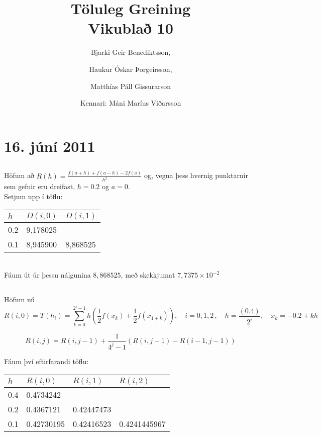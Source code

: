 \documentclass[10pt,a4paper]{article}
\begin{document}
\title{Töluleg Greining\\Vikublað 10}
\author{ 
  Bjarki Geir Benediktsson,\and
  Haukur Óskar Þorgeirsson,\and
  Matthías Páll Gissurarson \and
  Kennari: Máni Maríus Viðarsson
  }
\maketitle

\setcounter{section}{8}

\section{16. júní 2011}

\subsection{}

Höfum að $R(h) = \frac{f(a+h) + f(a-h) - 2f(a)}{h^2}$ og, vegna þess hvernig punktarnir sem gefnir eru dreifast, $h=0.2$ og $a=0$.\\

Setjum upp í töflu:

\begin{tabular}{l|ll}
$h$&$D(i,0)$&$D(i,1)$\\ \hline
0.2&9,178025\\
0.1&8,945900&8,868525\\
\end{tabular}\\

Fáum út úr þessu nálgunina $8,868525$, með skekkjumat $7,7375 \times 10^{-2}$

\subsection{}

Höfum nú 
\[R(i,0)=T(h_i)=\sum_{k=0}^{2^i-1}h(\frac{1}{2}f(x_k) + \frac{1}{2}f(x_{1+k})),\quad i=0,1,2\, , \quad h=\frac{(0.4)}{2^i},\quad x_k =  -0.2 + kh\]

\[
R(i,j)=R(i,j-1) + \frac{1}{4^j-1}(R(i,j-1)-R(i-1,j-1))
\]

Fáum því eftirfarandi töflu:

\begin{tabular}{l|lll}
$h$&$R(i,0)$&$R(i,1)$&$R(i,2)$\\ \hline
0.4&0.4734242\\
0.2&0.4367121&0.42447473\\
0.1&0.42730195&0.42416523&0.4241445967\\
\end{tabular}
\end{document}
